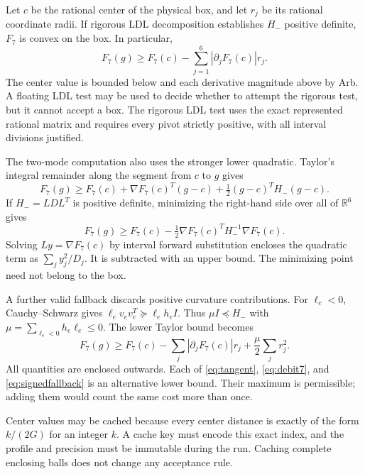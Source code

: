 \documentclass[11pt]{amsart}
\numberwithin{equation}{section}
\newcommand{\R}{\mathbb R}
\begin{document}
Let $c$ be the rational center of the physical box, and let $r_j$
be its rational coordinate radii. If rigorous LDL decomposition
establishes $H_-$ positive definite, $F_7$ is convex on the box.
In particular,
\begin{equation}\label{eq:tangent}
 F_7(g)\geq F_7(c)-\sum_{j=1}^6|\partial_j F_7(c)|r_j.
\end{equation}
The center value is bounded below and each derivative magnitude above
by Arb. A floating LDL test may be used to decide whether to attempt
the rigorous test, but it cannot accept a box. The rigorous LDL test
uses the exact represented rational matrix and requires every pivot
strictly positive, with all interval divisions justified.

The two-mode computation also uses the stronger lower quadratic.
Taylor's integral remainder along the segment from $c$ to $g$ gives
\begin{equation}\label{eq:quadratic7}
 F_7(g)\geq F_7(c)+\nabla F_7(c)^T(g-c)
                   +\tfrac12(g-c)^TH_-(g-c).
\end{equation}
If $H_-=LDL^T$ is positive definite, minimizing the right-hand side
over all of $\R^6$ gives
\begin{equation}\label{eq:debit7}
 F_7(g)\geq F_7(c)-\tfrac12\nabla F_7(c)^TH_-^{-1}\nabla F_7(c).
\end{equation}
Solving $Ly=\nabla F_7(c)$ by interval forward substitution encloses
the quadratic term as $\sum_j y_j^2/D_j$. It is subtracted with an
upper bound. The minimizing point need not belong to the box.

A further valid fallback discards positive curvature contributions.
For $\ell_e<0$, Cauchy--Schwarz gives
$\ell_ev_ev_e^T\succeq\ell_e h_e I$.
Thus $\mu I\preceq H_-$ with
$\mu=\sum_{\ell_e<0}h_e\ell_e\leq0$. The lower Taylor bound becomes
\begin{equation}\label{eq:signedfallback}
 F_7(g)\geq F_7(c)-\sum_j|\partial_jF_7(c)|r_j
                       +\frac\mu2\sum_jr_j^2.
\end{equation}
All quantities are enclosed outwards. Each of
\eqref{eq:tangent}, \eqref{eq:debit7}, and
\eqref{eq:signedfallback} is an alternative lower bound. Their
maximum is permissible; adding them would count the same cost more
than once.

Center values may be cached because every center distance is exactly
of the form $k/(2G)$ for an integer $k$. A cache key must encode this
exact index, and the profile and precision must be immutable during
the run. Caching complete enclosing balls does not change any
acceptance rule.
\end{document}
